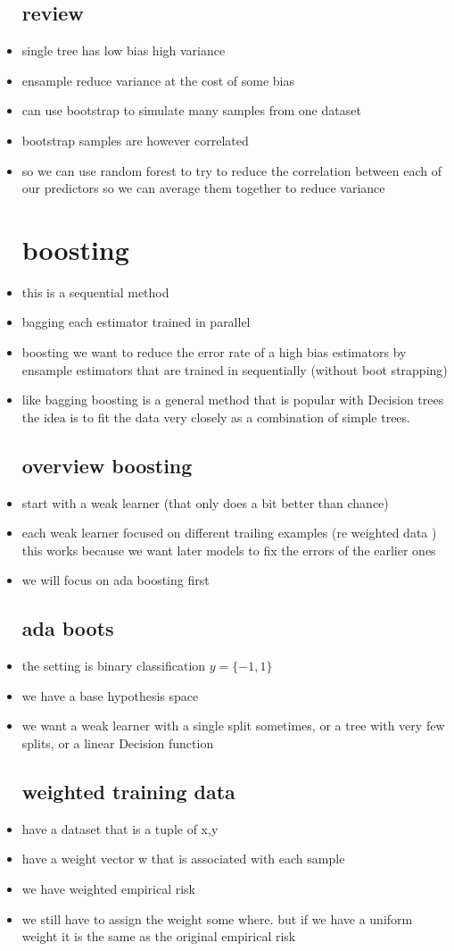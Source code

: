 \documentclass{article}
\begin{document}
\begin{itemize}
\subsection*{review}
\item single tree has low bias high variance
\item ensample reduce variance at the cost of some bias 
\item can use bootstrap to simulate many samples from one dataset 
\item bootstrap samples are however correlated
\item so we can use random forest to try to reduce the correlation between each of our predictors so we can average them together to reduce variance
\section*{boosting}
\item this is a sequential method 
\item bagging each estimator trained in parallel
\item boosting we want to reduce the error rate of a high bias estimators by ensample estimators that are trained in sequentially (without boot strapping)
\item like bagging boosting is a general method that is popular with Decision trees the 
idea is to fit the data very closely as a combination of simple trees. 
\subsection*{overview boosting}
\item start with a weak learner (that only does a bit better than chance)
\item each weak learner focused on different trailing examples (re weighted data ) this works because we want later models to fix the errors of the earlier ones 
\item we will focus on ada boosting first 
\subsection*{ada boots}
\item the setting is binary classification $y=\{-1,1\}$
\item we have a base hypothesis space 
\item we want a weak learner with a single split sometimes, or a tree with very few splits, or a linear Decision function
\subsection*{weighted training data}
\item have a dataset that is a tuple of x,y 
\item have a weight vector w that is associated with each sample 
\item we have weighted empirical risk 
\item we still have to assign the weight some where. but if we have a uniform weight it is the same as the original empirical risk 

\end{itemize}
\end{document}
